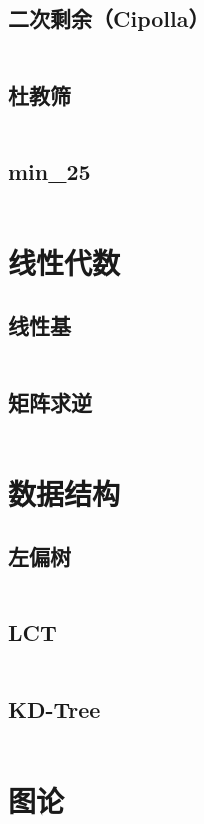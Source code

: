 \documentclass[a4paper,9]{article}
\begin{document}
\subsection{二次剩余（Cipolla）}

\inputminted[breaklines]{c++}{number_theory/cipolla.cpp}
\subsection{杜教筛}
\inputminted[breaklines]{c++}{number_theory/dujiaoshai.cpp}
\subsection{min\_25}
\inputminted[breaklines]{c++}{number_theory/min25.cpp}

\section{线性代数}
\subsection{线性基}
\inputminted[breaklines]{c++}{linear_algebra/lb.cpp}
\subsection{矩阵求逆}
\inputminted[breaklines]{c++}{linear_algebra/matrix_inversion.cpp}

\section{数据结构}
\subsection{左偏树}
\inputminted[breaklines]{c++}{data_structure/leftist_tree.cpp}
\subsection{LCT}
\inputminted[breaklines]{c++}{data_structure/lct.cpp}
\subsection{KD-Tree}
\inputminted[breaklines]{c++}{data_structure/kd_tree.cpp}

\section{图论}
\end{document}
